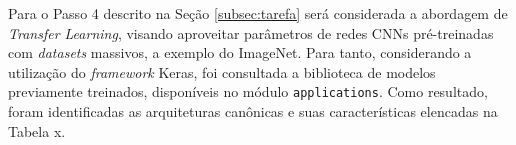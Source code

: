 Para o Passo 4 descrito na Seção \ref{subsec:tarefa} será considerada a abordagem de \emph{Transfer Learning}, visando aproveitar parâmetros de redes CNNs pré-treinadas com \emph{datasets} massivos, a exemplo do ImageNet. Para tanto, considerando a utilização do \emph{framework} Keras, foi consultada a biblioteca de modelos previamente treinados, disponíveis no módulo \texttt{applications}. Como resultado, foram identificadas as arquiteturas canônicas e suas características elencadas na Tabela x.



